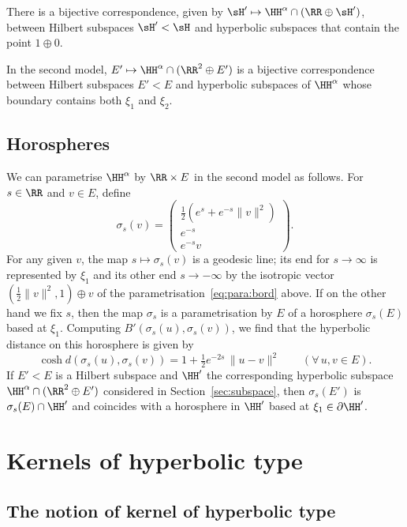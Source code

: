 There is a bijective correspondence, given by $\sH'\mapsto \HH^\alpha \cap (\RR\oplus \sH')$, between Hilbert subspaces $\sH'< \sH$ and hyperbolic subspaces that contain the point $1\oplus 0$.

In the second model, $E'\mapsto \HH^\alpha \cap (\RR^2\oplus E')$ is a bijective correspondence between Hilbert subspaces $E'<E$ and hyperbolic subspaces of $\HH^\alpha$ whose boundary contains both $\xi_1$ and $\xi_2$.

\subsection{Horospheres}\label{sec:horo}

We can parametrise $\HH^\alpha$ by $\RR\times E$ in the second model as follows. For $s\in \RR$ and $v\in E$, define
\[
\sigma_s(v) =
\begin{pmatrix}
\frac 12 (e^s + e^{-s} \|v\|^2)\\
e^{-s}\\
e^{-s} v
\end{pmatrix}.
\]
For any given $v$, the map $s\mapsto \sigma_s(v)$ is a geodesic line; its end for $s\to\infty$ is represented by $\xi_1$ and its other end $s\to-\infty$ by the isotropic vector $(\frac12 \|v\|^2,1)\oplus v$ of the parametrisation~\eqref{eq:para:bord} above. If on the other hand we fix $s$, then the map $\sigma_s$ is a parametrisation by $E$ of a horosphere $\sigma_s(E)$ based at $\xi_1$. Computing $B'(\sigma_s(u),\sigma_s(v))$, we find that the hyperbolic distance on this horosphere is given by
\begin{equation}\label{eq:horo:CNT}
\cosh d(\sigma_s(u),\sigma_s(v)) = 1 + \tfrac 12 e^{-2 s}\, \|u-v\|^2 \qquad(\forall\,u,v\in E).
\end{equation}
If $E'<E$ is a Hilbert subspace and $\HH'$ the corresponding hyperbolic subspace $\HH^\alpha \cap (\RR^2\oplus E')$ considered in Section~\ref{sec:subspace}, then $\sigma_s(E')$ is $\sigma_s(E)\cap \HH'$ and coincides with a horosphere in $\HH'$ based at $\xi_1\in\partial\HH'$.


\section{Kernels of hyperbolic type}\label{sec:kernels}

\subsection{The notion of kernel of hyperbolic type}


